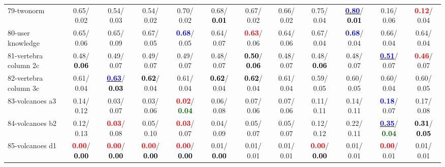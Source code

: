 \begin{table}[h]
\begin{center}
{\begin{tabular}{lc|c|c|c|c|c|c|c|c|c|c}
79-twonorm &   0.65/  0.02 &   0.54/  0.03 &   0.54/  0.02 &   0.70/  0.02 &   0.68/\textcolor{black}{\textbf{  0.01}} &   0.67/  0.02 &   0.66/  0.02 &   0.75/  0.04 & \underline{\textcolor{blue}{\textbf{  0.80}}}/\textcolor{black}{\textbf{  0.01}} &   0.16/  0.06 & \textcolor{red}{\textbf{  0.12}}/  0.04 \\
80-user knowledge &   0.65/  0.06 &   0.65/  0.09 &   0.67/  0.05 & \textcolor{blue}{\textbf{  0.68}}/  0.05 &   0.64/  0.07 & \textcolor{red}{\textbf{  0.63}}/  0.06 &   0.64/  0.06 &   0.67/  0.04 & \textcolor{blue}{\textbf{  0.68}}/  0.04 &   0.66/  0.04 &   0.64/  0.04 \\
81-vertebra column 2c &   0.48/\textcolor{black}{\textbf{  0.06}} &   0.49/  0.07 &   0.49/  0.07 &   0.49/  0.07 &   0.48/  0.07 & \textcolor{black}{\textbf{  0.50}}/\textcolor{black}{\textbf{  0.06}} &   0.48/  0.07 &   0.48/\textcolor{black}{\textbf{  0.06}} &   0.48/  0.07 & \underline{\textcolor{blue}{\textbf{  0.51}}}/  0.07 & \textcolor{red}{\textbf{  0.46}}/  0.07 \\
82-vertebra column 3c &   0.61/  0.04 & \underline{\textcolor{blue}{\textbf{  0.63}}}/\textcolor{black}{\textbf{  0.03}} & \textcolor{black}{\textbf{  0.62}}/  0.04 &   0.61/  0.04 & \textcolor{black}{\textbf{  0.62}}/  0.04 & \textcolor{black}{\textbf{  0.62}}/  0.04 &   0.61/  0.04 &   0.59/  0.05 &   0.60/  0.05 &   0.60/  0.04 &   0.60/  0.05 \\
83-volcanoes a3 &   0.14/  0.12 &   0.03/  0.07 &   0.03/  0.06 & \textcolor{red}{\textbf{  0.02}}/\textcolor{darkgreen}{\textbf{  0.04}} &   0.06/  0.08 &   0.07/  0.06 &   0.07/  0.06 &   0.11/  0.11 &   0.14/  0.11 & \textcolor{blue}{\textbf{  0.18}}/  0.07 &   0.17/  0.08 \\
84-volcanoes b2 &   0.12/  0.13 & \textcolor{red}{\textbf{  0.03}}/  0.08 &   0.05/  0.10 & \textcolor{red}{\textbf{  0.03}}/  0.07 &   0.04/  0.09 &   0.05/  0.07 &   0.05/  0.07 &   0.12/  0.12 &   0.22/  0.11 & \underline{\textcolor{blue}{\textbf{  0.35}}}/\textcolor{darkgreen}{\textbf{  0.04}} & \textcolor{black}{\textbf{  0.31}}/\textcolor{black}{\textbf{  0.05}} \\
85-volcanoes d1 & \textcolor{red}{\textbf{  0.00}}/\textcolor{black}{\textbf{  0.00}} & \textcolor{red}{\textbf{  0.00}}/\textcolor{black}{\textbf{  0.00}} & \textcolor{red}{\textbf{  0.00}}/\textcolor{black}{\textbf{  0.00}} & \textcolor{red}{\textbf{  0.00}}/\textcolor{black}{\textbf{  0.00}} &   0.01/\textcolor{black}{\textbf{  0.00}} &   0.01/  0.01 &   0.01/  0.01 & \textcolor{red}{\textbf{  0.00}}/\textcolor{black}{\textbf{  0.00}} &   0.01/  0.01 & \textcolor{red}{\textbf{  0.00}}/  0.01 &   0.01/  0.01 \\ \hline

\end{tabular}}
\end{center}
\end{table}
